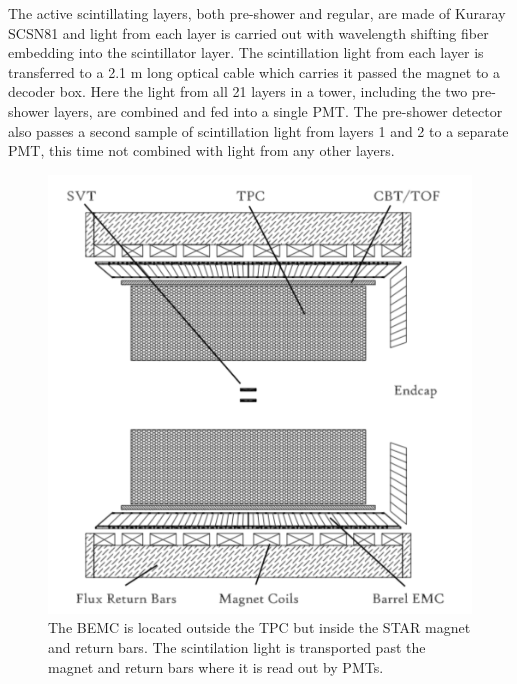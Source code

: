 \documentclass[abstract = on,listof=totoc, bibliography=totoc]{scrreprt}
\begin{document}
The active scintillating layers, both pre-shower and regular, are made of Kuraray SCSN81 and light from each layer is carried out with wavelength shifting fiber embedding into the scintillator layer. The scintillation light from each layer is transferred to a 2.1 m long optical cable which carries it passed the magnet to a decoder box. Here the light from all 21 layers in a tower, including the two pre-shower layers, are combined and fed into a single PMT. The pre-shower detector also passes a second sample of scintillation light from layers 1 and 2 to a separate PMT, this time not combined with light from any other layers.  

\begin{figure}
\begin{center}
\includegraphics[width = .7\textwidth]{BEMC1}
\caption[Barrel Electromagnetic Calorimeter]{The BEMC is located outside the TPC but inside the STAR magnet and return bars. The scintilation light is transported past the magnet and return bars where it is read out by PMTs.}
\label{fig:BEMC1}
\end{center}
\end{figure}
\end{document}

